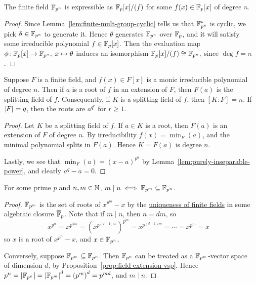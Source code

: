 \begin{lemma}\label{lem:finite-field-quotient}
    The finite field \(\mathbb{F}_{p^n}\) is expressible as \(\mathbb{F}_p[x]/(f)\)
    for some \(f(x) \in \mathbb{F}_p[x]\) of degree \(n\).
\end{lemma}
\begin{proof}
    Since Lemma~\ref{lem:finite-mult-group-cyclic}
    tells us that \(\mathbb{F}_{p^n}^\ast\) is cyclic,
    we pick \(\theta \in \mathbb{F}_{p^n}\) to generate it.
    Hence \(\theta\) generates \(\mathbb{F}_{p^n}\) over \(\mathbb{F}_p\),
    and it will satisfy some irreducible polynomial \(f \in \mathbb{F}_p[x]\).
    Then the evaluation map \(\phi\colon\mathbb{F}_p[x]\to\mathbb{F}_{p^n},\;x\mapsto\theta\)
    induces an isomorphism \(\mathbb{F}_p[x]/(f) \cong \mathbb{F}_{p^n}\),
    since \(\deg f = n\).
\end{proof}
\begin{corollary}
    Suppose \(F\) is a finite field,
    and \(f(x) \in F[x]\) is a monic irreducible polynomial of degree \(n\).
    Then if \(a\) is a root of \(f\) in an extension of \(F\),
    then \(F(a)\) is the splitting field of \(f\).
    Consequently, if \(K\) is a splitting field of \(f\),
    then \([K:F] = n\).
    If \(\abs{F} = q\), then the roots are \(a^{q^r}\) for \(r \geq 1\).
\end{corollary}
\begin{proof}
    Let \(K\) be a splitting field of \(f\).
    If \(a \in K\) is a root,
    then \(F(a)\) is an extension of \(F\) of degree \(n\).
    By irreducibility \(f(x) = \min_F(a)\),
    and the minimal polynomial splits in \(F(a)\).
    Hence \(K = F(a)\) is degree \(n\).

    Lastly, we see that \(\min_F(a) = {(x-a)}^{p^n}\)
    by Lemma~\ref{lem:purely-inseparable-power},
    and clearly \(a^q - a = 0\).
\end{proof}

\begin{proposition}\label{prop:finite-field-size-inclusion}
    For some prime \(p\) and \(n,m \in \mathbb{N}\),
    \(m \mid n \iff \mathbb{F}_{p^m} \subseteq \mathbb{F}_{p^n}\).
\end{proposition}
\begin{proof}
    \(\mathbb{F}_{p^m}\) is the set of roots of \(x^{p^m} - x\)
    by the \hyperref[cor:uniqueness-finite-field]{uniqueness of finite fields}
    in some algebraic closure \(\overline{\mathbb{F}}_p\).
    Note that if \(m \mid n\), then \(n = dm\), so
    \begin{equation*}
        x^{p^n} = x^{p^{dm}} = {(x^{p^{(d-1)m}})}^{p^m} = x^{p^{(d-1)m}}
        = \cdots = x^{p^m} = x
    \end{equation*}
    so \(x\) is a root of \(x^{p^n} - x\), and \(x \in \mathbb{F}_{p^n}\).

    Conversely, suppose \(\mathbb{F}_{p^m} \subseteq \mathbb{F}_{p^n}\).
    Then \(\mathbb{F}_{p^n}\) can be treated as a \(\mathbb{F}_{p^m}\)-vector space of dimension \(d\),
    by Proposition~\ref{prop:field-extension-vsp}.
    Hence \(p^n = \abs{\mathbb{F}_{p^n}} = \abs{\mathbb{F}_{p^m}}^d = {(p^m)}^d = p^{md}\),
    and \(m \mid n\).
\end{proof}

